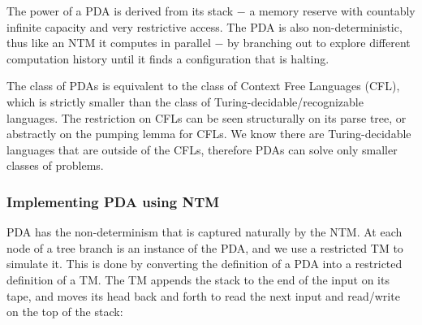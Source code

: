 \documentclass[12pt]{article}  %
\begin{document}
The power of a PDA is derived from its stack $-$ a memory reserve with countably infinite capacity and very restrictive access. The PDA is also non-deterministic, thus like an NTM it computes in parallel $-$ by branching out to explore different computation history until it finds a configuration that is halting.

The class of PDAs is equivalent to the class of Context Free Languages (CFL), which is strictly smaller than the class of Turing-decidable/recognizable languages. The restriction on CFLs can be seen structurally on its parse tree, or abstractly on the pumping lemma for CFLs. We know there are Turing-decidable languages that are outside of the CFLs, therefore PDAs can solve only smaller classes of problems. 




\subsubsection{Implementing PDA using NTM}
PDA has the non-determinism that is captured naturally by the NTM. At each node of a tree branch is an instance of the PDA, and we use a restricted TM to simulate it. This is done by converting the definition of a PDA into a restricted definition of a TM. The TM appends the stack to the end of the input on its tape, and moves its head back and forth to read the next input and read/write on the top of the stack:
\end{document}
